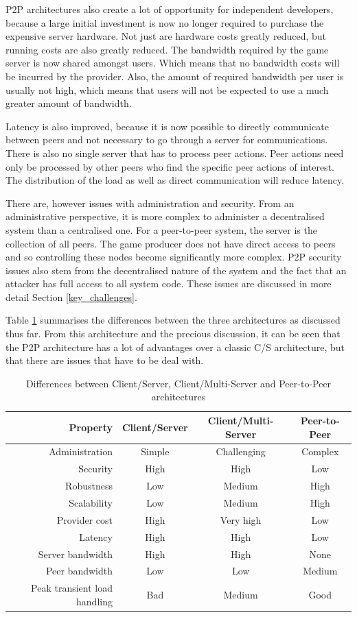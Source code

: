 \documentclass[journal,oneside,a4paper,onecolumn]{IEEEtran}
\begin{document}
\ac{P2P} architectures also create a lot of opportunity for independent developers, because a large initial investment is now no longer required to purchase the expensive server hardware. Not just are hardware costs greatly reduced, but running costs are also greatly reduced. The bandwidth required by the game server is now shared amongst users. Which means that no bandwidth costs will be incurred by the provider. Also, the amount of required bandwidth per user is usually not high, which means that users will not be expected to use a much greater amount of bandwidth.

Latency is also improved, because it is now possible to directly communicate between peers and not necessary to go through a server for communications. There is also no single server that has to process peer actions. Peer actions need only be processed by other peers who find the specific peer actions of interest. The distribution of the load as well as direct communication will reduce latency.

There are, however issues with administration and security. From an administrative perspective, it is more complex to administer a decentralised system than a centralised one. For a peer-to-peer system, the server is the collection of all peers. The game producer does not have direct access to peers and so controlling these nodes become significantly more complex. P2P security issues also stem from the decentralised nature of the system and the fact that an attacker has full access to all system code. These issues are discussed in more detail Section \ref{key_challenges}.

Table \ref{tab_archs} summarises the differences between the three architectures as discussed thus far. From this architecture and the precious discussion, it can be seen that the P2P architecture has a lot of advantages over a classic C/S architecture, but that there are issues that have to be deal with.
%
\begin{table}[htbp]
\centering
\begin{tabular}{|r|c|c|c|}
\hline
Property & Client/Server & Client/Multi-Server & Peer-to-Peer\\
\hline
Administration & Simple & Challenging & Complex\\
Security & High & High & Low\\
Robustness & Low & Medium & High\\
Scalability & Low & Medium & High\\
Provider cost & High & Very high & Low\\
Latency & High & High & Low\\
Server bandwidth & High & High & None\\
Peer bandwidth & Low & Low & Medium\\
Peak transient load handling & Bad & Medium & Good\\
\hline
\end{tabular}
\caption{Differences between Client/Server, Client/Multi-Server and Peer-to-Peer architectures}
\label{tab_archs}
\end{table}
\end{document}
